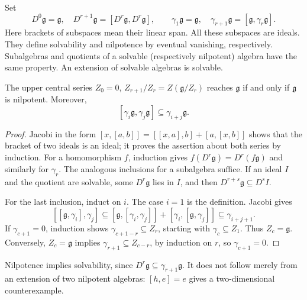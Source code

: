 \begin{proposition}\label{res:A02}
Set
\[
 D^0\mathfrak g=\mathfrak g,\quad
 D^{r+1}\mathfrak g=[D^r\mathfrak g,D^r\mathfrak g],\qquad
 \gamma _1\mathfrak g=\mathfrak g,\quad
 \gamma _{r+1}\mathfrak g=[\mathfrak g,\gamma _r\mathfrak g].
\]
Here brackets of subspaces mean their linear span. All these subspaces
are ideals. They define solvability and nilpotence by eventual
vanishing, respectively. Subalgebras and quotients of a solvable
(respectively nilpotent) algebra have the same property. An extension
of solvable algebras is solvable.

The upper central series \(Z_0=0\),
\(Z_{r+1}/Z_r=Z(\mathfrak g/Z_r)\) reaches \(\mathfrak g\) if and only
if \(\mathfrak g\) is nilpotent. Moreover,
\[
 [\gamma_i\mathfrak g,\gamma_j\mathfrak g]
 \subseteq\gamma_{i+j}\mathfrak g.
\]
\end{proposition}

\begin{proof}
Jacobi in the form
\([x,[a,b]]=[[x,a],b]+[a,[x,b]]\) shows that the bracket of two
ideals is an ideal; it proves the assertion about both series by
induction. For a homomorphism \(f\), induction gives
\(f(D^r\mathfrak g)=D^r(f\mathfrak g)\) and similarly for \(\gamma_r\).
The analogous inclusions for a subalgebra suffice. If an ideal \(I\)
and the quotient are solvable, some \(D^r\mathfrak g\) lies in \(I\),
and then \(D^{r+s}\mathfrak g\subseteq D^s I\).

For the last inclusion, induct on \(i\). The case \(i=1\) is the
definition. Jacobi gives
\[
 [[\mathfrak g,\gamma_i],\gamma_j]
 \subseteq[\mathfrak g,[\gamma_i,\gamma_j]]
       +[\gamma_i,[\mathfrak g,\gamma_j]]
 \subseteq\gamma_{i+j+1}.
\]
If \(\gamma_{c+1}=0\), induction shows
\(\gamma_{c+1-r}\subseteq Z_r\), starting with
\(\gamma_c\subseteq Z_1\). Thus \(Z_c=\mathfrak g\).
Conversely, \(Z_c=\mathfrak g\) implies
\(\gamma_{r+1}\subseteq Z_{c-r}\), by induction on \(r\), so
\(\gamma_{c+1}=0\).
\end{proof}

Nilpotence implies solvability, since \(D^r\mathfrak g\subseteq
\gamma_{r+1}\mathfrak g\). It does not follow merely from an extension
of two nilpotent algebras: \([h,e]=e\) gives a two-dimensional
counterexample.

